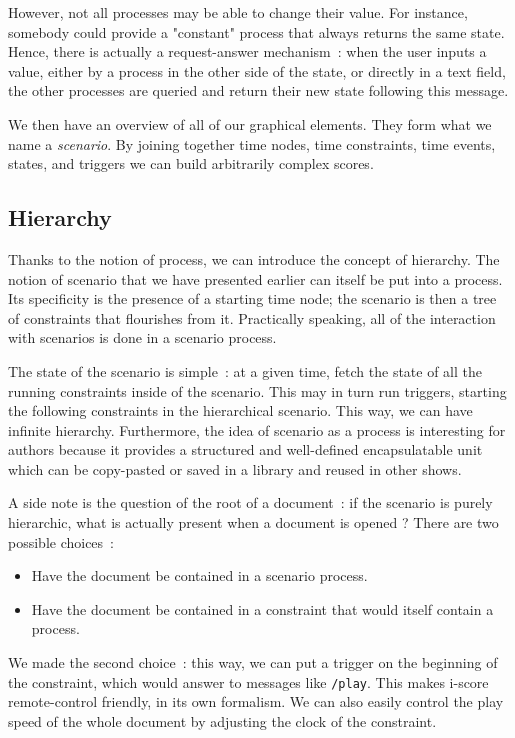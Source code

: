 \documentclass{sigchi}
\begin{document}
However, not all processes may be able to change their value. For instance, somebody could provide a "constant" process that always returns the same state. Hence, there is actually a request-answer mechanism~: when the user inputs a value, either by a process in the other side of the state, or directly in a text field, the other processes are queried and return their new state following this message.

We then have an overview of all of our graphical elements. They form what we name a \textit{scenario}. By joining together time nodes, time constraints, time events, states, and triggers we can build arbitrarily complex scores. 



\subsection{Hierarchy}
\label{sechierarchy}
Thanks to the notion of process, we can introduce the concept of hierarchy. The notion of scenario that we have presented earlier can itself be put into a process. Its specificity is the presence of a starting time node; the scenario is then a tree of constraints that flourishes from it. Practically speaking, all of the interaction with scenarios is done in a scenario process.

The state of the scenario is simple~: at a given time, fetch the state of all the running constraints inside of the scenario. This may in turn run triggers, starting the following constraints in the hierarchical scenario. This way, we can have infinite hierarchy.
Furthermore, the idea of scenario as a process is interesting for authors because it provides a structured and well-defined encapsulatable unit which can be copy-pasted or saved in a library and reused in other shows.

A side note is the question of the root of a document~: if the scenario is purely hierarchic, what is actually present when a document is opened ? There are two possible choices~: 
\begin{itemize}
    \item Have the document be contained in a scenario process.
    \item Have the document be contained in a constraint that would itself contain a process. 
\end{itemize}
    
We made the second choice~: this way, we can put a trigger on the beginning of the constraint, which would answer to messages like \texttt{/play}. This makes i-score remote-control friendly, in its own formalism.
We can also easily control the play speed of the whole document by adjusting the clock of the constraint.
    
\end{document}
